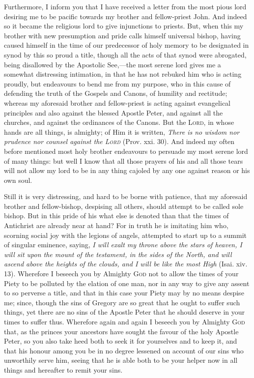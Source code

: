 Furthermore, I inform you that I have received a letter from the most pious lord desiring me to be pacific towards my brother and fellow-priest John. And indeed so it became the religious lord to give injunctions to priests. But, when this my brother with new presumption and pride calls himself universal bishop, having caused himself in the time of our predecessor of holy memory to be designated in synod by this so proud a title, though all the acts of that synod were abrogated, being disallowed by the Apostolic See,—the most serene lord gives me a somewhat distressing intimation, in that he has not rebuked him who is acting proudly, but endeavours to bend me from my purpose, who in this cause of defending the truth of the Gospels and Canons, of humility and rectitude; whereas my aforesaid brother and fellow-priest is acting against evangelical principles and also against the blessed Apostle Peter, and against all the churches, and against the ordinances of the Canons. But the \textsc{Lord}, in whose hands are all things, is almighty; of Him it is written, \emph{There is no wisdom nor prudence nor counsel against the \textsc{Lord}} (Prov. xxi. 30). And indeed my often before mentioned most holy brother endeavours to persuade my most serene lord of many things: but well I know that all those prayers of his and all those tears will not allow my lord to be in any thing cajoled by any one against reason or his own soul.

Still it is very distressing, and hard to be borne with patience, that my aforesaid brother and fellow-bishop, despising all others, should attempt to be called sole bishop. But in this pride of his what else is denoted than that the times of Antichrist are already near at hand? For in truth he is imitating him who, scorning social joy with the legions of angels, attempted to start up to a summit of singular eminence, saying, \emph{I will exalt my throne above the stars of heaven, I will sit upon the mount of the testament, in the sides of the North, and will ascend above the heights of the clouds, and I will be like the most High} (Isai. xiv. 13). Wherefore I beseech you by Almighty \textsc{God} not to allow the times of your Piety to be polluted by the elation of one man, nor in any way to give any assent to so perverse a title, and that in this case your Piety may by no means despise me; since, though the sins of Gregory are so great that he ought to suffer such things, yet there are no sins of the Apostle Peter that he should deserve in your times to suffer thus. Wherefore again and again I beseech you by Almighty \textsc{God} that, as the princes your ancestors have sought the favour of the holy Apostle Peter, so you also take heed both to seek it for yourselves and to keep it, and that his honour among you be in no degree lessened on account of our sins who unworthily serve him, seeing that he is able both to be your helper now in all things and hereafter to remit your sins.

